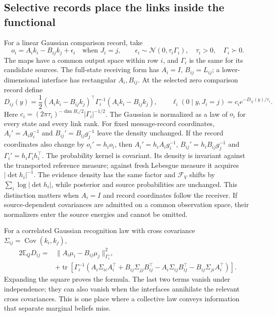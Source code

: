 \subsection{Selective records place the links inside the functional}
For a linear Gaussian comparison record, take
\begin{equation}
o_i=A_i k_i-B_{ij}k_j+\epsilon_i
\quad\text{when }J_i=j,\qquad
\epsilon_i\sim\mathcal N(0,\tau_i\Gamma_i),
\quad \tau_i>0,\quad\Gamma_i\succ0.
\label{eq:selective_record}
\end{equation}
The maps have a common output space within row $i$, and $\Gamma_i$ is the same for its candidate sources. The full-state receiving form has $A_i=I$, $B_{ij}=L_{ij}$; a lower-dimensional interface has rectangular $A_i,B_{ij}$. At the selected zero comparison record define
\begin{equation}
D_{ij}(y)=\frac12(A_i k_i-B_{ij}k_j)^\top
\Gamma_i^{-1}(A_i k_i-B_{ij}k_j),\qquad
\ell_i(0\mid y,J_i=j)=c_i e^{-D_{ij}(y)/\tau_i}.
\label{eq:normalized_link_energy}
\end{equation}
Here $c_i=(2\pi\tau_i)^{-\dim H_i/2}|\Gamma_i|^{-1/2}$. The Gaussian is normalized as a law of $o_i$ for every state and every link rank. For fixed message-record coordinates, $A_i'=A_i g_i^{-1}$ and $B_{ij}'=B_{ij}g_j^{-1}$ leave the density unchanged. If the record coordinates also change by $o_i'=h_i o_i$, then $A_i'=h_iA_i g_i^{-1}$, $B_{ij}'=h_iB_{ij}g_j^{-1}$ and $\Gamma_i'=h_i\Gamma_i h_i^\top$. The probability kernel is covariant. Its density is invariant against the transported reference measure; against fresh Lebesgue measure it acquires $|\det h_i|^{-1}$. The evidence density has the same factor and $\mathcal F_V$ shifts by $\sum_i\log|\det h_i|$, while posterior and source probabilities are unchanged. This distinction matters when $A_i=I$ and record coordinates follow the receiver. If source-dependent covariances are admitted on a common observation space, their normalizers enter the source energies and cannot be omitted.

For a correlated Gaussian recognition law with cross covariance $\Sigma_{ij}=\operatorname{Cov}(k_i,k_j)$,
\begin{equation}
\begin{split}
2\mathbb E_QD_{ij}
={}&\|A_i\mu_i-B_{ij}\mu_j\|_{\Gamma_i^{-1}}^2\\
&+\operatorname{tr}\left[\Gamma_i^{-1}
(A_i\Sigma_{ii}A_i^\top+B_{ij}\Sigma_{jj}B_{ij}^\top
-A_i\Sigma_{ij}B_{ij}^\top-B_{ij}\Sigma_{ji}A_i^\top)\right].
\end{split}
\label{eq:correlated_link_cost}
\end{equation}
Expanding the square proves the formula. The last two terms vanish under independence; they can also vanish when the interfaces annihilate the relevant cross covariances. This is one place where a collective law conveys information that separate marginal beliefs miss.

